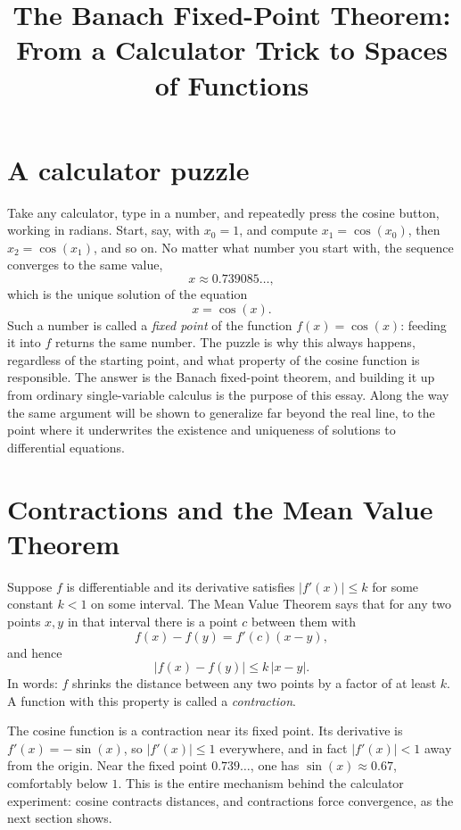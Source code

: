 \documentclass{essay}
\title{The Banach Fixed-Point Theorem:\\
From a Calculator Trick to Spaces of Functions}
\author{}
\date{}
\begin{document}
\maketitle

\section{A calculator puzzle}

Take any calculator, type in a number, and repeatedly press the cosine
button, working in radians. Start, say, with $x_0 = 1$, and compute
$x_1 = \cos(x_0)$, then $x_2 = \cos(x_1)$, and so on. No matter what
number you start with, the sequence converges to the same value,
\[
  x \approx 0.739085\ldots,
\]
which is the unique solution of the equation
\[
  x = \cos(x).
\]
Such a number is called a \emph{fixed point} of the function
$f(x) = \cos(x)$: feeding it into $f$ returns the same number. The
puzzle is why this always happens, regardless of the starting point,
and what property of the cosine function is responsible. The answer
is the Banach fixed-point theorem, and building it up from ordinary
single-variable calculus is the purpose of this essay. Along the way
the same argument will be shown to generalize far beyond the real
line, to the point where it underwrites the existence and uniqueness
of solutions to differential equations.

\section{Contractions and the Mean Value Theorem}

Suppose $f$ is differentiable and its derivative satisfies
$|f'(x)| \le k$ for some constant $k < 1$ on some interval. The Mean
Value Theorem says that for any two points $x, y$ in that interval
there is a point $c$ between them with
\[
  f(x) - f(y) = f'(c)(x - y),
\]
and hence
\[
  |f(x) - f(y)| \le k\,|x - y|.
\]
In words: $f$ shrinks the distance between any two points by a factor
of at least $k$. A function with this property is called a
\emph{contraction}.

The cosine function is a contraction near its fixed point. Its
derivative is $f'(x) = -\sin(x)$, so $|f'(x)| \le 1$ everywhere, and
in fact $|f'(x)| < 1$ away from the origin. Near the fixed point
$0.739\ldots$, one has $\sin(x) \approx 0.67$, comfortably below $1$.
This is the entire mechanism behind the calculator experiment:
cosine contracts distances, and contractions force convergence, as
the next section shows.
\end{document}
